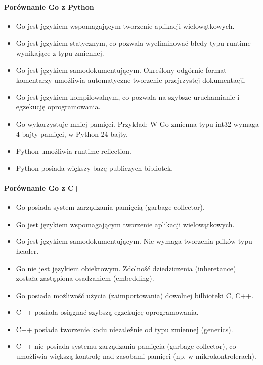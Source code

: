 \documentclass[a4paper,12pt,twoside,openany]{report}
\begin{document}
\paragraph{Porównanie Go z Python}
\begin{itemize}
 \item Go jest językiem wspomagającym tworzenie aplikacji wielowątkowych.
 \item Go jest językiem statycznym, co pozwala wyeliminować błedy typu runtime wynikające z typu zmiennej.
 \item Go jest językiem samodokumentującym. Określony odgórnie format komentarzy umożliwia automatyczne tworzenie przejrzystej dokumentacji.
 \item Go jest językiem kompilowalnym, co pozwala na szybsze uruchamianie i egzekucję oprogramowania.
 \item Go wykorzystuje mniej pamięci. Przykład: W Go zmienna typu int32 wymaga 4 bajty pamięci, w Python 24 bajty.
 \item Python umożliwia runtime reflection.
 \item Python posiada większy bazę publiczych bibliotek.
\end{itemize}

\paragraph{Porównanie Go z C++}
\begin{itemize}
 \item Go posiada system zarządzania pamięcią (garbage collector).
 \item Go jest językiem wspomagającym tworzenie aplikacji wielowątkowych.
 \item Go jest językiem samodokumentującym. Nie wymaga tworzenia plików typu header.
 \item Go nie jest językiem obiektowym. Zdolność dziedziczenia (inheretance) została zastąpiona osadzaniem (embedding).
 \item Go posiada możliwość użycia (zaimportowania) dowolnej bilbioteki C, C++.
 \item C++ posiada osiągnać szybszą egzekujcę oprogramowania.
 \item C++ posiada tworzenie kodu niezależnie od typu zmiennej (generics).
 \item C++ nie posiada systemu zarządzania pamięcia (garbage collector), co umożliwia większą kontrolę nad zasobami pamięci (np. w mikrokontrolerach).
\end{itemize}
\end{document}
